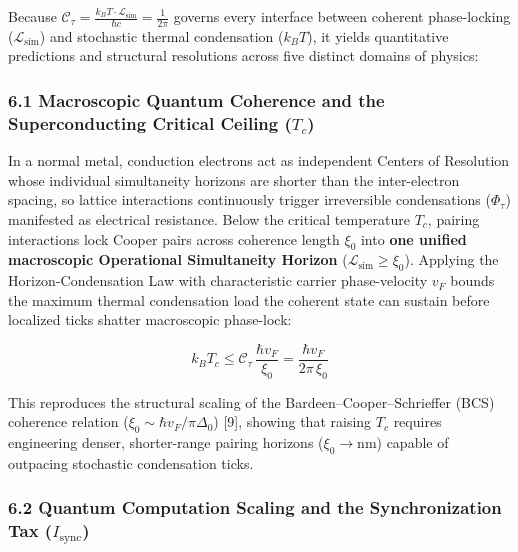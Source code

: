 \documentclass[
]{article}
\begin{document}
Because
\(\mathcal{C}_\tau = \frac{k_B T \cdot \mathcal{L}_{\mathrm{sim}}}{\hbar c} = \frac{1}{2\pi}\)
governs every interface between coherent phase-locking
(\(\mathcal{L}_{\mathrm{sim}}\)) and stochastic thermal condensation
(\(k_B T\)), it yields quantitative predictions and structural
resolutions across five distinct domains of physics:

\subsubsection{\texorpdfstring{6.1 Macroscopic Quantum Coherence and the
Superconducting Critical Ceiling
(\(T_c\))}{6.1 Macroscopic Quantum Coherence and the Superconducting Critical Ceiling (T\_c)}}\label{macroscopic-quantum-coherence-and-the-superconducting-critical-ceiling-t_c}

In a normal metal, conduction electrons act as independent Centers of
Resolution whose individual simultaneity horizons are shorter than the
inter-electron spacing, so lattice interactions continuously trigger
irreversible condensations (\(\Phi_\tau\)) manifested as electrical
resistance. Below the critical temperature \(T_c\), pairing interactions
lock Cooper pairs across coherence length \(\xi_0\) into \textbf{one
unified macroscopic Operational Simultaneity Horizon}
(\(\mathcal{L}_{\mathrm{sim}} \ge \xi_0\)). Applying the
Horizon-Condensation Law with characteristic carrier phase-velocity
\(v_F\) bounds the maximum thermal condensation load the coherent state
can sustain before localized ticks shatter macroscopic phase-lock:

\[k_B T_c \le \mathcal{C}_\tau\,\frac{\hbar v_F}{\xi_0} = \frac{\hbar v_F}{2\pi\,\xi_0}\]

This reproduces the structural scaling of the
Bardeen--Cooper--Schrieffer (BCS) coherence relation
(\(\xi_0 \sim \hbar v_F / \pi\Delta_0\)) {[}9{]}, showing that raising
\(T_c\) requires engineering denser, shorter-range pairing horizons
(\(\xi_0 \to \text{nm}\)) capable of outpacing stochastic condensation
ticks.

\subsubsection{\texorpdfstring{6.2 Quantum Computation Scaling and the
Synchronization Tax
(\(I_{\mathrm{sync}}\))}{6.2 Quantum Computation Scaling and the Synchronization Tax (I\_\{\textbackslash mathrm\{sync\}\})}}\label{quantum-computation-scaling-and-the-synchronization-tax-i_mathrmsync}
\end{document}

